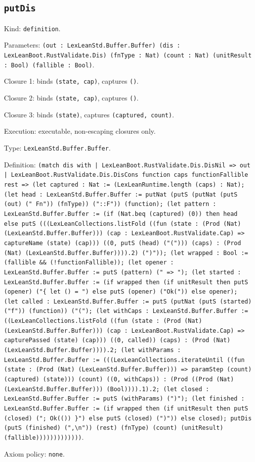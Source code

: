 \documentclass[11pt]{article}
\begin{document}
\subsection*{\texttt{putDis}}
\noindent Kind: \texttt{definition}.\par
\noindent Parameters: \texttt{(out : LexLeanStd.Buffer.Buffer) (dis : LexLeanBoot.RustValidate.Dis) (fnType : Nat) (count : Nat) (unitResult : Bool) (fallible : Bool)}.\par
\noindent Closure 1: binds \texttt{(state, cap)}, captures \texttt{()}.\par
\noindent Closure 2: binds \texttt{(state, cap)}, captures \texttt{()}.\par
\noindent Closure 3: binds \texttt{(state)}, captures \texttt{(captured, count)}.\par
\noindent Execution: executable, non-escaping closures only.\par
\noindent Type: \texttt{LexLeanStd.Buffer.Buffer}.\par
\noindent Definition: \texttt{(match dis with | LexLeanBoot.RustValidate.Dis.DisNil => out | LexLeanBoot.RustValidate.Dis.DisCons function caps functionFallible rest => (let captured : Nat := (LexLeanRuntime.length (caps) : Nat); (let head : LexLeanStd.Buffer.Buffer := putNat (putS (putNat (putS (out) ("            Fn")) (fnType)) ("::F")) (function); (let pattern : LexLeanStd.Buffer.Buffer := (if (Nat.beq (captured) (0)) then head else putS (((LexLeanCollections.listFold ((fun (state : (Prod (Nat) (LexLeanStd.Buffer.Buffer))) (cap : LexLeanBoot.RustValidate.Cap) => captureName (state) (cap))) ((0, putS (head) ("("))) (caps) : (Prod (Nat) (LexLeanStd.Buffer.Buffer)))).2) (")")); (let wrapped : Bool := (fallible \&\& (!functionFallible)); (let opener : LexLeanStd.Buffer.Buffer := putS (pattern) (" => "); (let started : LexLeanStd.Buffer.Buffer := (if wrapped then (if unitResult then putS (opener) ("\{ let () = ") else putS (opener) ("Ok(")) else opener); (let called : LexLeanStd.Buffer.Buffer := putS (putNat (putS (started) ("f")) (function)) ("("); (let withCaps : LexLeanStd.Buffer.Buffer := ((LexLeanCollections.listFold ((fun (state : (Prod (Nat) (LexLeanStd.Buffer.Buffer))) (cap : LexLeanBoot.RustValidate.Cap) => capturePassed (state) (cap))) ((0, called)) (caps) : (Prod (Nat) (LexLeanStd.Buffer.Buffer)))).2; (let withParams : LexLeanStd.Buffer.Buffer := (((LexLeanCollections.iterateUntil ((fun (state : (Prod (Nat) (LexLeanStd.Buffer.Buffer))) => paramStep (count) (captured) (state))) (count) ((0, withCaps)) : (Prod ((Prod (Nat) (LexLeanStd.Buffer.Buffer))) (Bool)))).1).2; (let closed : LexLeanStd.Buffer.Buffer := putS (withParams) (")"); (let finished : LexLeanStd.Buffer.Buffer := (if wrapped then (if unitResult then putS (closed) ("; Ok(()) \}") else putS (closed) (")")) else closed); putDis (putS (finished) (",\textbackslash{}n")) (rest) (fnType) (count) (unitResult) (fallible)))))))))))))}.\par
\noindent Axiom policy: \texttt{none}.\par
\end{document}
